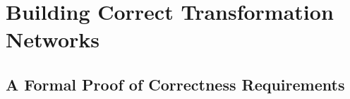 \part{Building Correct Transformation Networks 
}

\chapter{A Formal Proof of Correctness Requirements
}








